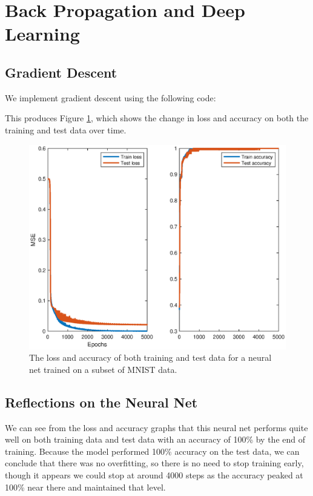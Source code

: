 \documentclass[11pt, oneside]{article}
\begin{document}
\section{Back Propagation and Deep Learning}

\subsection{Gradient Descent}

We implement gradient descent using the following code:


This produces Figure \ref{fig:netMetrics}, which shows the change in loss and accuracy on both the training and test data over time.

\begin{figure}[ht!]
\includegraphics[width=1\textwidth]{netMetrics.eps}
\caption{The loss and accuracy of both training and test data for a neural net trained on a subset of MNIST data.}
\label{fig:netMetrics}
\end{figure}

\subsection{Reflections on the Neural Net}

We can see from the loss and accuracy graphs that this neural net performs quite well on both training data and test data with an accuracy of 100\% by the end of training. Because the model performed 100\% accuracy on the test data, we can conclude that there was no overfitting, so there is no need to stop training early, though it appears we could stop at around 4000 steps as the accuracy peaked at 100\% near there and maintained that level.
\end{document}
